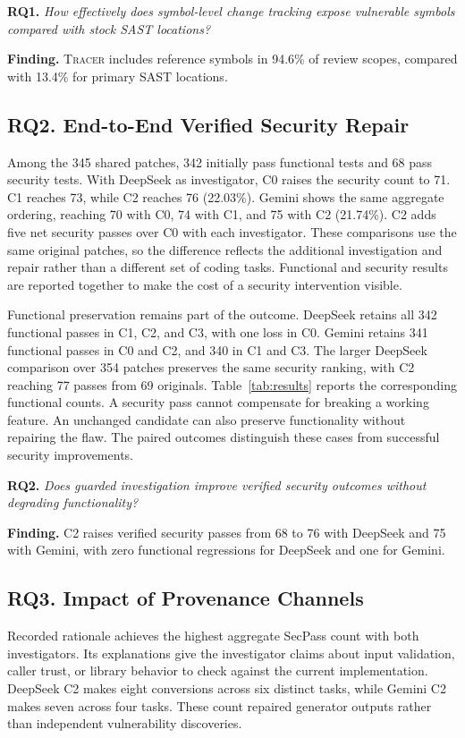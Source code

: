 \documentclass[10pt,conference]{IEEEtran}
\newcommand{\tracer}{\textsc{Tracer}}
\newcommand{\rqfinding}[3]{%
  \begin{tcolorbox}[
    colback=rqback, colframe=rqframe,
    boxrule=0.4pt, leftrule=3.5pt, arc=1.5pt,
    left=6pt, right=6pt, top=5pt, bottom=5pt,
    fontupper=\small
  ]
  \textbf{#1.} \emph{#2}\par
  \smallskip
  \textbf{Finding.} #3
  \end{tcolorbox}%
}
\begin{document}
\rqfinding{RQ1}{How effectively does symbol-level change tracking expose vulnerable symbols compared with stock SAST locations?}{\tracer{} includes reference symbols in 94.6\% of review scopes, compared with 13.4\% for primary SAST locations.}

\subsection{RQ2. End-to-End Verified Security Repair}
\begin{table}[t]
\caption{Verified repair outcomes. Panel A reports FuncPass and SecPass counts. Panel B reports SecPass for DeepSeek and Gemini on the same 345 patches. Bold marks each investigator's maximum across C0 to C3, including ties.}
\label{tab:results}
\centering\footnotesize

\end{table}
Among the 345 shared patches, 342 initially pass functional tests and 68 pass security tests. With DeepSeek as investigator, C0 raises the security count to 71. C1 reaches 73, while C2 reaches 76 (22.03\%). Gemini shows the same aggregate ordering, reaching 70 with C0, 74 with C1, and 75 with C2 (21.74\%). C2 adds five net security passes over C0 with each investigator. These comparisons use the same original patches, so the difference reflects the additional investigation and repair rather than a different set of coding tasks. Functional and security results are reported together to make the cost of a security intervention visible.

Functional preservation remains part of the outcome. DeepSeek retains all 342 functional passes in C1, C2, and C3, with one loss in C0. Gemini retains 341 functional passes in C0 and C2, and 340 in C1 and C3. The larger DeepSeek comparison over 354 patches preserves the same security ranking, with C2 reaching 77 passes from 69 originals. Table~\ref{tab:results} reports the corresponding functional counts. A security pass cannot compensate for breaking a working feature. An unchanged candidate can also preserve functionality without repairing the flaw. The paired outcomes distinguish these cases from successful security improvements.

\rqfinding{RQ2}{Does guarded investigation improve verified security outcomes without degrading functionality?}{C2 raises verified security passes from 68 to 76 with DeepSeek and 75 with Gemini, with zero functional regressions for DeepSeek and one for Gemini.}

\subsection{RQ3. Impact of Provenance Channels}
Recorded rationale achieves the highest aggregate SecPass count with both investigators. Its explanations give the investigator claims about input validation, caller trust, or library behavior to check against the current implementation. DeepSeek C2 makes eight conversions across six distinct tasks, while Gemini C2 makes seven across four tasks. These count repaired generator outputs rather than independent vulnerability discoveries.
\end{document}
